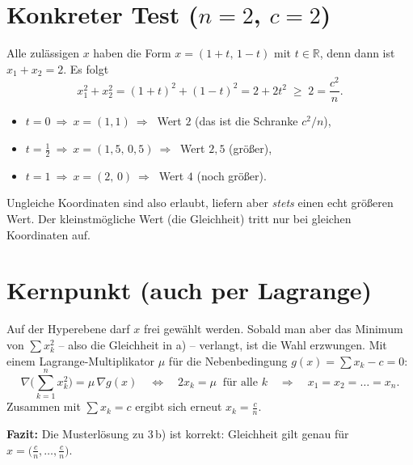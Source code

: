 \documentclass[a4paper,12pt]{article}
\begin{document}
\section*{Konkreter Test ($n=2$, $c=2$)}
Alle zulässigen $x$ haben die Form $x=(1+t,\,1-t)$ mit $t\in\mathbb{R}$, denn dann ist
$x_1+x_2=2$. Es folgt
\[
  x_1^2+x_2^2=(1+t)^2+(1-t)^2=2+2t^2\;\ge\;2=\frac{c^2}{n}.
\]
\begin{itemize}[itemsep=2pt]
  \item $t=0\ \Rightarrow\ x=(1,1)\ \Rightarrow\ $ Wert $2$ \;(das ist die Schranke $c^2/n$),
  \item $t=\tfrac12\ \Rightarrow\ x=(1{,}5,\,0{,}5)\ \Rightarrow\ $ Wert $2{,}5$ \;(größer),
  \item $t=1\ \Rightarrow\ x=(2,\,0)\ \Rightarrow\ $ Wert $4$ \;(noch größer).
\end{itemize}
Ungleiche Koordinaten sind also erlaubt, liefern aber \emph{stets} einen echt größeren Wert.
Der kleinstmögliche Wert (die Gleichheit) tritt nur bei gleichen Koordinaten auf.

\section*{Kernpunkt (auch per Lagrange)}
Auf der Hyperebene darf $x$ frei gewählt werden. Sobald man aber das Minimum von
$\sum x_k^2$ -- also die Gleichheit in a) -- verlangt, ist die Wahl erzwungen. Mit einem
Lagrange-Multiplikator $\mu$ für die Nebenbedingung $g(x)=\sum x_k-c=0$:
\[
  \nabla\Big(\sum_{k=1}^n x_k^2\Big)=\mu\,\nabla g(x)
  \quad\Longleftrightarrow\quad
  2x_k=\mu\ \text{ für alle } k
  \quad\Longrightarrow\quad
  x_1=x_2=\dots=x_n.
\]
Zusammen mit $\sum x_k=c$ ergibt sich erneut $x_k=\tfrac{c}{n}$.

\medskip
\noindent\textbf{Fazit:} Die Musterlösung zu 3\,b) ist korrekt: Gleichheit gilt genau für
$x=\big(\tfrac{c}{n},\dots,\tfrac{c}{n}\big)$.
\end{document}
